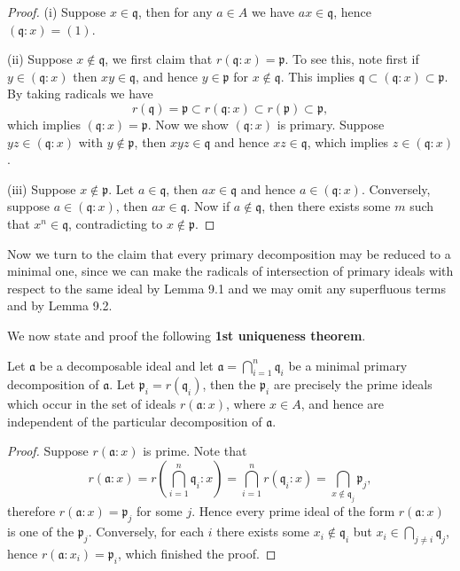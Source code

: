 \begin{proof}
(i) Suppose $x\in\mathfrak{q}$, then for any $a\in A$ we have $ax\in\mathfrak{q}$, hence $(\mathfrak{q}:x)=(1)$.\par
(ii) Suppose $x\notin\mathfrak{q}$, we first claim that $r(\mathfrak{q}:x)=\mathfrak{p}$. To see this, note first if $y\in(\mathfrak{q}:x)$ then $xy\in\mathfrak{q}$, and hence $y\in\mathfrak{p}$ for $x\notin\mathfrak{q}$. This implies $\mathfrak{q}\subset(\mathfrak{q}:x)\subset\mathfrak{p}$. By taking radicals we have 
$$
r\left( \mathfrak{q} \right) =\mathfrak{p} \subset r\left( \mathfrak{q} :x \right) \subset r\left( \mathfrak{p} \right) \subset \mathfrak{p} ,
$$
which implies $(\mathfrak{q}:x)=\mathfrak{p}$. Now we show $(\mathfrak{q}:x)$ is primary. Suppose $yz\in(\mathfrak{q}:x)$ with $y\notin\mathfrak{p}$, then $xyz\in\mathfrak{q}$ and hence $xz\in\mathfrak{q}$, which implies $z\in(\mathfrak{q}:x)$.\par
(iii) Suppose $x\notin\mathfrak{p}$. Let $a\in\mathfrak{q}$, then $ax\in\mathfrak{q}$ and hence $a\in(\mathfrak{q}:x)$. Conversely, suppose $a\in(\mathfrak{q}:x)$, then $ax\in\mathfrak{q}$. Now if $a\notin\mathfrak{q}$, then there exists some $m$ such that $x^n\in\mathfrak{q}$, contradicting to $x\notin\mathfrak{p}$.
\end{proof}
Now we turn to the claim that every primary decomposition may be reduced to a minimal one, since we can make the radicals of intersection of primary ideals with respect to the same ideal by Lemma 9.1 and we may omit any superfluous terms and by Lemma 9.2.\par
We now state and proof the following \textbf{1st uniqueness theorem}.
\begin{theorem}
Let $\mathfrak{a}$ be a decomposable ideal and let $\mathfrak{a}=\bigcap_{i=1}^n\mathfrak{q}_i$ be a minimal primary decomposition of $\mathfrak{a}$. Let $\mathfrak{p}_i=r(\mathfrak{q}_i)$, then the $\mathfrak{p}_i$ are precisely the prime ideals which occur in the set of ideals $r(\mathfrak{a}:x)$, where $x\in A$, and hence are independent of the particular decomposition of $\mathfrak{a}$.
\end{theorem}
\begin{proof}
Suppose $r(\mathfrak{a}:x)$ is prime. Note that 
$$
r\left( \mathfrak{a} :x \right) =r\left( \bigcap_{i=1}^n{\mathfrak{q} _i}:x \right) =\bigcap_{i=1}^n{r\left( \mathfrak{q} _i:x \right)}=\bigcap_{x\notin \mathfrak{q} _j}{\mathfrak{p} _j},
$$
therefore $r(\mathfrak{a}:x)=\mathfrak{p}_j$ for some $j$. Hence every prime ideal of the form $r(\mathfrak{a}:x)$ is one of the $\mathfrak{p}_j$. Conversely, for each $i$ there exists some $x_i\notin\mathfrak{q}_i$ but $x_i\in\bigcap_{j\ne i}\mathfrak{q}_j$, hence $r(\mathfrak{a}:x_i)=\mathfrak{p}_i$, which finished the proof.
\end{proof}
